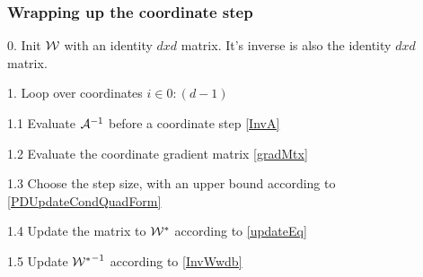 \subsubsection{Wrapping up the coordinate step}

0. Init $\mathcal{W}$ with an identity $dxd$ matrix. It's inverse is also the identity $dxd$ matrix.

1. Loop over coordinates $i \in 0:(d-1)$

1.1 Evaluate $\mathcal{A}^{-1}$ before a coordinate step \eqref{InvA}

1.2 Evaluate the coordinate gradient matrix \eqref{gradMtx}

1.3 Choose the step size, with an upper bound according to \eqref{PDUpdateCondQuadForm}

1.4 Update the matrix to ${\mathcal{W^*}}$ according to \eqref{updateEq}

1.5 Update ${\mathcal{W^*}}^{-1}$ according to \eqref{InvWwdb}
